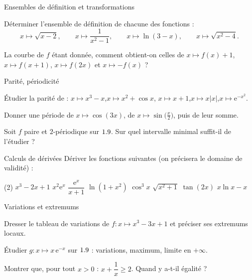 \exercices
{}

\begin{exercice}[1]{Ensembles de définition et transformations}
\begin{questions}
  \item Déterminer l'ensemble de définition de chacune des fonctions :
    \[
      x\mapsto\sqrt{x-2},\qquad x\mapsto\frac{1}{x^{2}-1},\qquad
      x\mapsto\ln(3-x),\qquad x\mapsto\sqrt{x^{2}-4}.
    \]
  \item La courbe de $f$ étant donnée, comment obtient-on celles de
    $x\mapsto f(x)+1$, $x\mapsto f(x+1)$, $x\mapsto f(2x)$ et
    $x\mapsto-f(x)$ ?
\end{questions}
\end{exercice}

\begin{exercice}[1]{Parité, périodicité}
\begin{questions}
  \item Étudier la parité de :
    $x\mapsto x^{3}-x$,\quad $x\mapsto x^{2}+\cos x$,\quad
    $x\mapsto x+1$,\quad $x\mapsto x|x|$,\quad $x\mapsto\mathrm{e}^{-x^{2}}$.
  \item Donner une période de $x\mapsto\cos(3x)$, de
    $x\mapsto\sin\bigl(\frac{x}{2}\bigr)$, puis de leur somme.
  \item Soit $f$ paire et $2$-périodique sur $1.9$. Sur quel intervalle
    minimal suffit-il de l'étudier ?
\end{questions}
\end{exercice}

\begin{exercice}[1]{Calculs de dérivées}
Dériver les fonctions suivantes (on précisera le domaine de validité) :
\begin{tasks}(2)
  \task $x^{3}-2x+1$
  \task $x^{2}\mathrm{e}^{x}$
  \task $\dfrac{\mathrm{e}^{x}}{x+1}$
  \task $\ln(1+x^{2})$
  \task $\cos^{3}x$
  \task $\sqrt{x^{2}+1}$
  \task $\tan(2x)$
  \task $x\ln x-x$
\end{tasks}
\end{exercice}

\begin{exercice}[1]{Variations et extremums}
\begin{questions}
  \item Dresser le tableau de variations de $f:x\mapsto x^{3}-3x+1$ et
    préciser ses extremums locaux.
  \item Étudier $g:x\mapsto x\,\mathrm{e}^{-x}$ sur $1.9$ : variations, maximum,
    limite en $+\infty$.
  \item Montrer que, pour tout $x>0$ : $x+\dfrac1x\geq2$. Quand y a-t-il
    égalité ?
\end{questions}
\end{exercice}

